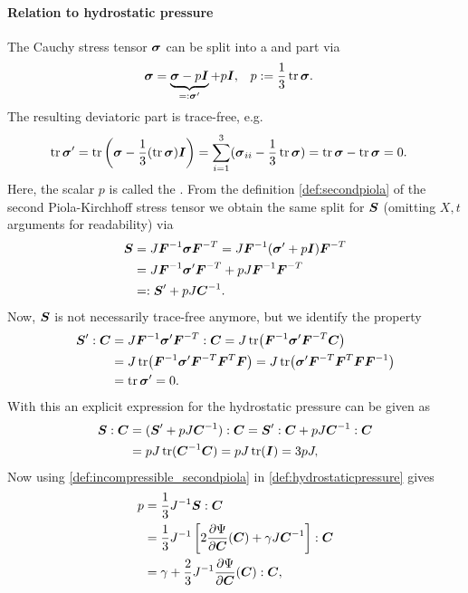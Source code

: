 \paragraph{Relation to hydrostatic pressure}
The Cauchy stress tensor $\vsig$ can be split into a  and  part via
\begin{align}
	\vsig &= \underbrace{\vsig - p\vI}_{=:\vsig'} + p\vI, & p &:= \frac{1}{3}\tr\vsig.
\end{align}
The resulting deviatoric part is trace-free, e.g.
\begin{align}
	\tr{\vsig'} &= \tr\left(\vsig - \frac{1}{3}(\tr\vsig)\vI\right) = \suml{i=1}{3}(\vsig_{ii} - \frac{1}{3}\tr\vsig) = \tr\vsig - \tr\vsig = 0.
\end{align}
Here, the scalar $p$ is called the .
From the definition \eqref{def:secondpiola} of the second Piola-Kirchhoff stress tensor we obtain the same split for $\vS$
(omitting $X,t$ arguments for readability) via
\begin{align}
	\vS &= J\vF^{-1}\vsig\vF^{-T} = J\vF^{-1}(\vsig' + p\vI)\vF^{-T}\\
		&= J\vF^{-1}\vsig'\vF^{-T} + pJ\vF^{-1}\vF^{-T}\\
		&=: \vS' + pJ\vC^{-1}.
\end{align}
Now, $\vS$ is not necessarily trace-free anymore, but we identify the property
\begin{align}
	\vS' : \vC &= J\vF^{-1}\vsig'\vF^{-T} : \vC = J\tr\bigl(\vF^{-1}\vsig'\vF^{-T}\vC\bigr)\\
		&= J\tr\bigl(\vF^{-1}\vsig'\vF^{-T}\vF^T\vF\bigr) = J\tr\bigl(\vsig'\vF^{-T}\vF^T\vF\vF^{-1}\bigr)\\
		&= \tr\vsig' = 0.
\end{align}
With this an explicit expression for the hydrostatic pressure can be given as
\begin{align}
	\vS : \vC &= (\vS' + pJ\vC^{-1}) : \vC = \vS': \vC + pJ\vC^{-1} : \vC\\
	&= pJ\tr(\vC^{-1}\vC) = pJ\tr(\vI) = 3pJ,\label{def:hydrostaticpressure}
\end{align}
Now using \eqref{def:incompressible_secondpiola} in \eqref{def:hydrostaticpressure} gives
\begin{align}
	p &= \frac{1}{3}J^{-1}\vS : \vC\\
	  &= \frac{1}{3}J^{-1}\left[2\d{\Psi}{\vC}(\vC) + \gamma J\vC^{-1}\right] : \vC\\
	  &= \gamma + \frac{2}{3}J^{-1}\d{\Psi}{\vC}(\vC):\vC,
\end{align}
